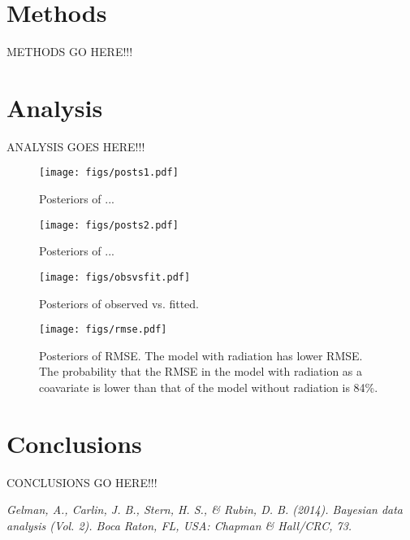 \documentclass{../../tex_template/asaproc}
\begin{document}
\section{Methods}
METHODS GO HERE!!!

\section{Analysis}
ANALYSIS GOES HERE!!!
\begin{figure}[H]
  \texttt{[image: figs/posts1.pdf]}
  \caption{\small Posteriors of ... }
  \label{fig:posts1}
\end{figure}

\begin{figure}[H]
  \texttt{[image: figs/posts2.pdf]}
  \caption{\small Posteriors of ... }
  \label{fig:posts2}
\end{figure}

\begin{figure}[H]
  \texttt{[image: figs/obsvsfit.pdf]}
  \caption{\small Posteriors of observed vs. fitted. }
  \label{fig:obsvsfit}
\end{figure}

\begin{figure}[H]
  \texttt{[image: figs/rmse.pdf]}
  \caption{\small Posteriors of RMSE. The model with radiation has lower RMSE. The probability that the RMSE in the
   model with radiation as a coavariate is lower than that of the model without radiation is 84\%.}
  \label{fig:rmse}
\end{figure}

\section{Conclusions}
CONCLUSIONS GO HERE!!!

\begin{references}
{\footnotesize
\itemsep=3pt
\item {\em Gelman, A., Carlin, J. B., Stern, H. S., \& Rubin, D. B. (2014). Bayesian data analysis (Vol. 2). Boca Raton, FL, USA: Chapman \& Hall/CRC, 73.}
}

\end{references}
\end{document}
